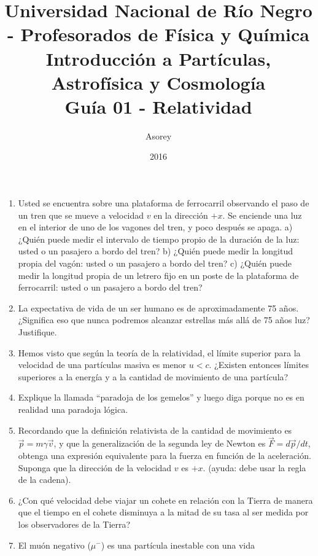 \documentclass[a4paper,12pt]{article}
\begin{document}
\title{
{\normalsize{Universidad Nacional de Río Negro - Profesorados de Física y Química}}\\
Introducción a Partículas, Astrofísica y Cosmología \\ Guía 01 - Relatividad\\}
\author{Asorey}
\date{2016}
\maketitle

\begin{enumerate}
	\setcounter{enumi}{0}      %
	\item Usted se encuentra sobre una plataforma de ferrocarril observando el
		paso de un tren que se mueve a velocidad $v$ en la dirección $+x$. Se
		enciende una luz en el interior de uno de los vagones del tren, y poco
		después se apaga. a) ¿Quién puede medir el intervalo de tiempo propio
		de la duración de la luz: usted o un pasajero a bordo del tren? b)
		¿Quién puede medir la longitud propia del vagón: usted o un pasajero a
		bordo del tren? c) ¿Quién puede medir la longitud propia de un letrero
		fijo en un poste de la plataforma de ferrocarril: usted o un pasajero a
		bordo del tren?
	\item La expectativa de vida de un ser humano es de aproximadamente 75
		años. ¿Significa eso que nunca podremos alcanzar estrellas más allá de
		75 años luz? Justifique. 
	\item Hemos visto que según la teoría de la relatividad, el límite superior
		para la velocidad de una partículas masiva es menor $u < c$. ¿Existen
		entonces límites superiores a la energía y a la cantidad de movimiento
		de una partícula?
	\item Explique la llamada ``paradoja de los gemelos'' y luego diga porque
		no es en realidad una paradoja lógica.
	\item Recordando que la definición relativista de la cantidad de movimiento
		es $\vec{p}=m \gamma \vec{v}$, y que la generalización de la segunda
		ley de Newton es $\vec{F}=d\vec{p}/dt$, obtenga una expresión
		equivalente para la fuerza en función de la aceleración. Suponga que la
		dirección de la velocidad $v$ es $+x$. (ayuda: debe usar la regla de la
		cadena).   
	\item ¿Con qué velocidad debe viajar un cohete en relación con la Tierra de
		manera que el tiempo en el cohete disminuya a la mitad de su tasa al
		ser medida por los observadores de la Tierra?
	\item El muón negativo ($\mu^-$) es una partícula inestable con una vida

\end{enumerate}
\end{document}
